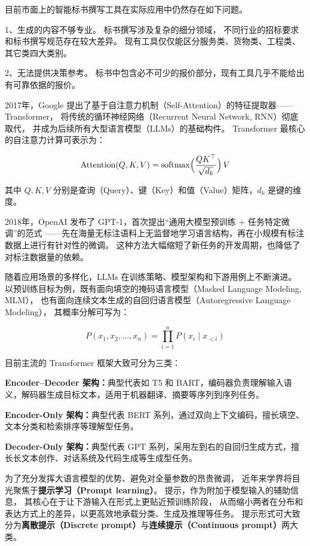 \documentclass{xmu}
\begin{document}
目前市面上的智能标书撰写工具在实际应用中仍然存在如下问题。

1、生成的内容不够专业。
标书撰写涉及复杂的细分领域，
不同行业的招标要求和标书撰写规范存在较大差异。
现有工具仅仅能区分服务类、货物类、工程类、其它类四大类别。

2、无法提供决策参考。
标书中包含必不可少的报价部分，现有工具几乎不能给出有可靠依据的报价。

2017年，Google 提出了基于自注意力机制（Self-Attention）的特征提取器——Transformer，
将传统的循环神经网络（Recurrent Neural Network, RNN）彻底取代，
并成为后续所有大型语言模型（LLMs）的基础构件。
Transformer 最核心的自注意力计算可表示为：

$$
\mathrm{Attention}(Q,K,V) = \mathrm{softmax}\Bigl(\frac{QK^\top}{\sqrt{d_k}}\Bigr)\,V
$$

其中 $Q, K, V$ 分别是查询（Query）、键（Key）和值（Value）矩阵，$d_k$ 是键的维度。

2018年，OpenAI 发布了 GPT-1，首次提出“通用大模型预训练 + 任务特定微调”的范式
——先在海量无标注语料上无监督地学习语言结构，再在小规模有标注数据上进行有针对性的微调。
这种方法大幅缩短了新任务的开发周期，也降低了对标注数据量的依赖。

随着应用场景的多样化，LLMs 在训练策略、模型架构和下游用例上不断演进。
以预训练目标为例，既有面向填空的掩码语言模型（Masked Language Modeling, MLM），
也有面向连续文本生成的自回归语言模型（Autoregressive Language Modeling），
其概率分解可写为：

$$
P(x_1, x_2, \dots, x_n) = \prod_{i=1}^n P(x_i \mid x_{<i})
$$

目前主流的 Transformer 框架大致可分为三类：

{\bf Encoder–Decoder 架构：}典型代表如 T5 和 BART，编码器负责理解输入语义，解码器生成目标文本，适用于机器翻译、摘要等序列到序列任务。

{\bf Encoder-Only 架构：}典型代表 BERT 系列，通过双向上下文编码，擅长填空、文本分类和检索排序等理解型任务。

{\bf Decoder-Only 架构：}典型代表 GPT 系列，采用左到右的自回归生成方式，擅长长文本创作、对话系统及代码生成等生成型任务。


为了充分发挥大语言模型的优势、避免对全量参数的昂贵微调，
近年来学界将目光聚焦于{\bf 提示学习（Prompt learning）}。
提示，作为附加于模型输入的辅助信息，
其核心在于让下游输入在形式上更贴近预训练阶段，
从而缩小两者在分布和表达方式上的差异，以更高效地承载分类、生成及推理等任务。
提示形式可大致分为{\bf 离散提示（Discrete prompt）}与{\bf 连续提示（Continuous prompt）}两大类。
\end{document}
